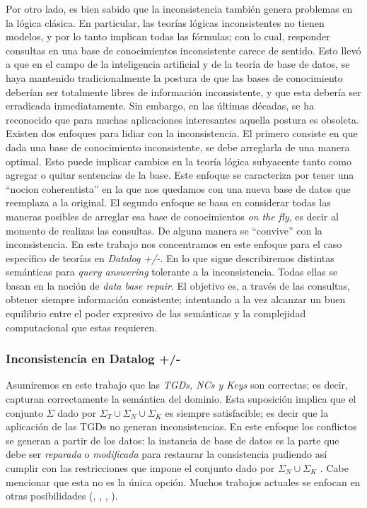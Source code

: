 \documentclass[11pt,a4paper,twoside]{tesis}
\begin{document}
Por otro lado, es bien sabido que la inconsistencia también genera problemas en la lógica clásica. En particular, las teorías lógicas inconsistentes no tienen modelos, y por lo tanto implican todas las fórmulas; con lo cual, responder consultas en una base de conocimientos inconsistente carece de sentido. Esto llevó a que en el campo de la inteligencia artificial y de la teoría de base de datos, se haya mantenido tradicionalmente la postura de que las bases de conocimiento deberían ser totalmente libres de información inconsistente, y que esta debería ser erradicada inmediatamente. Sin embargo, en las últimas décadas, se ha reconocido que para muchas aplicaciones interesantes aquella postura es obsoleta. 
Existen dos enfoques para lidiar con la inconsistencia. El primero consiste en que dada una base de conocimiento inconsistente, se debe arreglarla de una manera optimal. Esto puede implicar cambios en la teoría lógica subyacente tanto como agregar o quitar sentencias de la base. Este enfoque se caracteriza por tener una ``nocion coherentista'' en la que nos quedamos con una nueva base de datos que reemplaza a la original.  
El segundo enfoque se basa en considerar todas las maneras posibles de arreglar esa base de conocimientos \textit{on the fly}, es decir al momento de realizas las consultas. De alguna manera se ``convive'' con la inconsistencia. En este trabajo nos concentramos en este enfoque para el caso específico de teorías en \textit{Datalog +/-}. 
En lo que sigue describiremos distintas semánticas para \textit{query answering} tolerante a la inconsistencia. Todas ellas se basan en la noción de \textit{data base repair}. El objetivo es, a través de las consultas, obtener siempre información consistente; intentando a la vez alcanzar un buen equilibrio entre el poder expresivo de las semánticas y la complejidad computacional que estas requieren. 
\subsubsection{Inconsistencia en Datalog +/-}

Asumiremos en este trabajo que las \textit{TGDs, NCs y Keys} son correctas; es decir, capturan correctamente la semántica del dominio. Esta suposición implica que el conjunto $\Sigma$  dado por $\Sigma_T \cup \Sigma_N \cup \Sigma_K$  es siempre satisfacible; es decir que la aplicación de las TGDs no generan inconsistencias. En este enfoque los conflictos se generan a partir de los datos: la instancia de base de datos es la parte que debe ser \textit{reparada} o \textit{modificada} para restaurar la consistencia pudiendo así cumplir con las restricciones que impone el conjunto dado por $\Sigma_N \cup \Sigma_K$ . Cabe mencionar que esta no es la única opción. Muchos trabajos actuales se enfocan en otras posibilidades (\cite{Huang}, \cite{Hitzler}, \cite{Parsia}, \cite{Haasa}).
\end{document}
